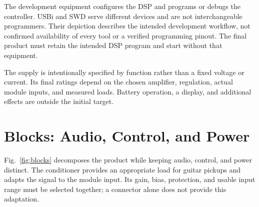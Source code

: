 \documentclass[conference]{IEEEtran}
\begin{document}
The development equipment configures the DSP and programs or debugs the
controller. USBi and SWD serve different devices and are not interchangeable
programmers. Their depiction describes the intended development workflow,
not confirmed availability of every tool or a verified programming pinout.
The final product must retain the intended DSP program and start without
that equipment.

The supply is intentionally specified by function rather than a fixed
voltage or current. Its final ratings depend on the chosen amplifier,
regulation, actual module inputs, and measured loads. Battery operation,
a display, and additional effects are outside the initial target.

\section{Blocks: Audio, Control, and Power}

Fig.~\ref{fig:blocks} decomposes the product while keeping audio, control,
and power distinct. The conditioner provides an appropriate load for guitar
pickups and adapts the signal to the module input. Its gain, bias, protection,
and usable input range must be selected together; a connector alone does
not provide this adaptation.
\end{document}

